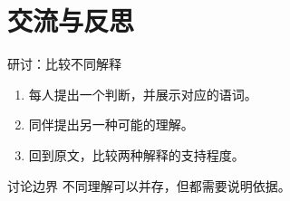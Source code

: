\documentclass[aspectratio=169]{ctexbeamer}
\begin{document}
\section{交流与反思}
\begin{frame}{研讨：比较不同解释}
  \begin{enumerate}
    \item 每人提出一个判断，并展示对应的语词。
    \item 同伴提出另一种可能的理解。
    \item 回到原文，比较两种解释的支持程度。
  \end{enumerate}
  \begin{alertblock}{讨论边界}
    不同理解可以并存，但都需要说明依据。
  \end{alertblock}
\end{frame}
\HUASclosingframe
\end{document}
